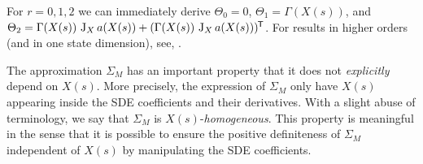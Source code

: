 \begin{remark}
	For $r=0,1,2$ we can immediately derive $\Theta_0 = 0$, $\Theta_1 = \Gamma(X(s))$, and $\Theta_2 = \Gamma(X(s)) \, \operatorname{J}_X a(X(s)) + (\Gamma(X(s)) \, \operatorname{J}_X a(X(s)))^{\mkern-1.5mu\mathsf{T}}$. For results in higher orders (and in one state dimension), see, \citet[][Example 9]{ZhaoTME2020}.
\end{remark}

The approximation $\Sigma_M$ has an important property that it does not \textit{explicitly} depend on $X(s)$. More precisely, the expression of $\Sigma_M$ only have $X(s)$ appearing inside the SDE coefficients and their derivatives. With a slight abuse of terminology, we say that $\Sigma_M$ is $X(s)$-\emph{homogeneous}. This property is meaningful in the sense that it is possible to ensure the positive definiteness of $\Sigma_M$ independent of $X(s)$ by manipulating the SDE coefficients.

